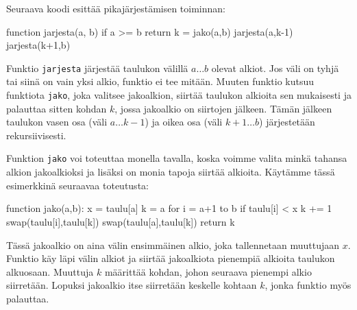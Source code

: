 Seuraava koodi esittää pikajärjestämisen toiminnan:

\begin{code}
function jarjesta(a, b)
    if a >= b
        return
    k = jako(a,b)
    jarjesta(a,k-1)
    jarjesta(k+1,b)
\end{code}

Funktio \texttt{jarjesta} järjestää taulukon välillä
$a \dots b$ olevat alkiot.
Jos väli on tyhjä tai siinä on vain yksi alkio,
funktio ei tee mitään.
Muuten funktio kutsuu funktiota \texttt{jako}, joka valitsee jakoalkion,
siirtää taulukon alkioita sen mukaisesti
ja palauttaa sitten kohdan $k$,
jossa jakoalkio on siirtojen jälkeen.
Tämän jälkeen taulukon vasen osa (väli $a \dots k-1$)
ja oikea osa (väli $k+1 \dots b$) järjestetään rekursiivisesti.

Funktion \texttt{jako} voi toteuttaa monella tavalla,
koska voimme valita minkä tahansa alkion jakoalkioksi ja
lisäksi on monia tapoja siirtää alkioita.
Käy\-tämme tässä esimerkkinä seuraavaa toteutusta:

\begin{code}
function jako(a,b):
    x = taulu[a]
    k = a
    for i = a+1 to b
        if taulu[i] < x
            k += 1
            swap(taulu[i],taulu[k])
    swap(taulu[a],taulu[k])
    return k
\end{code}

Tässä jakoalkio on aina välin ensimmäinen alkio,
joka tallennetaan muuttujaan $x$.
Funktio käy läpi välin alkiot ja siirtää
jakoalkiota pienempiä alkioita taulukon alkuosaan.
Muuttuja $k$ määrittää kohdan,
johon seuraava pienempi alkio siirretään.
Lopuksi jakoalkio itse siirretään keskelle
kohtaan $k$, jonka funktio myös palauttaa.

